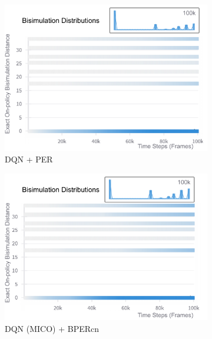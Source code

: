 \begin{figure}[H]
    \centering
    \begin{subfigure}{0.32\textwidth}
    \includegraphics[width=\linewidth]{Results/grid_world/exact_bisimulation_dqn_per.png}
        \caption{DQN + PER}
        \label{fig:exact_bisim_per}
    \end{subfigure}
    \hfill
    \begin{subfigure}{0.32\textwidth}
        \includegraphics[width=\linewidth]{Results/grid_world/exact_bisimulation_dqn_mico_bpercn.png}
        \caption{DQN (MICO) + BPERcn}
        \label{fig:exact_bisim_bpercn}
    \end{subfigure}
    \hfill
    \begin{subfigure}{0.32\textwidth}

\end{subfigure}
\end{figure}
